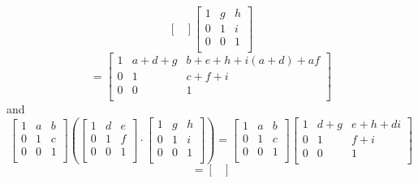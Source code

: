 \documentclass[12pt]{article}
\begin{document}
\begin{enumerate}[label=\textbf{\alph*.}]
\[\begin{bmatrix}
            \end{bmatrix}
            \begin{bmatrix}
                1 & g & h \\
                0 & 1 & i \\
                0 & 0 & 1 \\
            \end{bmatrix} \]
            \[ = \begin{bmatrix}
                1 & a + d + g & b + e + h + i(a + d) + af \\
                0 & 1 & c + f + i \\
                0 & 0 & 1 \\
            \end{bmatrix} \]
            and
            \[\begin{bmatrix}
                1 & a & b \\
                0 & 1 & c \\
                0 & 0 & 1 \\
            \end{bmatrix}
            \left( \begin{bmatrix}
                1 & d & e \\
                0 & 1 & f \\
                0 & 0 & 1 \\
            \end{bmatrix} \cdot
            \begin{bmatrix}
                1 & g & h \\
                0 & 1 & i \\
                0 & 0 & 1 \\
            \end{bmatrix} \right) 
            = \begin{bmatrix}
                1 & a & b \\
                0 & 1 & c \\
                0 & 0 & 1 \\
            \end{bmatrix}
            \begin{bmatrix}
                1 & d + g & e + h + di \\
                0 & 1 & f + i \\
                0 & 0 & 1 \\
            \end{bmatrix} \]
            \[ = \begin{bmatrix}

\end{bmatrix}\]
\end{enumerate}
\end{document}
